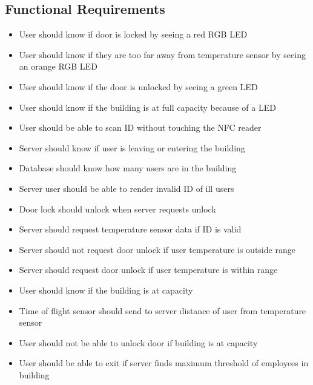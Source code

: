 \subsection{Functional Requirements}
\begin{itemize}
    \item User should know if door is locked by seeing a red RGB LED
    \item User should know if they are too far away from temperature sensor by seeing an orange RGB LED
    \item User should know if the door is unlocked by seeing a green LED
    \item User should know if the building is at full capacity because of a LED
    \item User should be able to scan ID without touching the NFC reader
    \item Server should know if user is leaving or entering the building
    \item Database should know how many users are in the building
    \item Server user should be able to render invalid ID of ill users
    \item Door lock should unlock when server requests unlock
    \item Server should request temperature sensor data if ID is valid
    \item Server should not request door unlock if user temperature is outside range
    \item Server should request door unlock if user temperature is within range
    \item User should know if the building is at capacity
    \item Time of flight sensor should send to server distance of user from temperature sensor
    \item User should not be able to unlock door if building is at capacity
    \item User should be able to exit if server finds maximum threshold of employees in building
\end{itemize}

